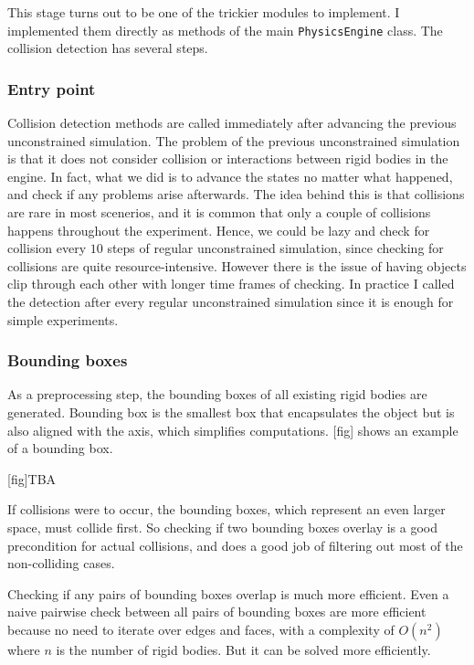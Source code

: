 \documentclass[12pt,a4paper,twoside,openright]{report}
\newcommand{\code}{\texttt}
\begin{document}
This stage turns out to be one of the trickier modules to implement. I implemented them directly as methods of the main \code{PhysicsEngine} class. The collision detection has several steps.

\subsubsection{Entry point} 
Collision detection methods are called immediately after advancing the previous unconstrained simulation. The problem of the previous unconstrained simulation is that it does not consider collision or interactions between rigid bodies in the engine. In fact, what we did is to advance the states no matter what happened, and check if any problems arise afterwards. The idea behind this is that collisions are rare in most scenerios, and it is common that only a couple of collisions happens throughout the experiment. Hence, we could be lazy and check for collision every $10$ steps of regular unconstrained simulation, since checking for collisions are quite resource-intensive. However there is the issue of having objects clip through each other with longer time frames of checking. In practice I called the detection after every regular unconstrained simulation since it is enough for simple experiments.

\subsubsection{Bounding boxes}
As a preprocessing step, the bounding boxes of all existing rigid bodies are generated. Bounding box is the smallest box that encapsulates the object but is also aligned with the axis, which simplifies computations. [fig] shows an example of a bounding box.

[fig]TBA

If collisions were to occur, the bounding boxes, which represent an even larger space, must collide first. So checking if two bounding boxes overlay is a good precondition for actual collisions, and does a good job of filtering out most of the non-colliding cases.

Checking if any pairs of bounding boxes overlap is much more efficient. Even a naive pairwise check between all pairs of bounding boxes are more efficient because no need to iterate over edges and faces, with a complexity of $O(n^2)$ where $n$ is the number of rigid bodies. But it can be solved more efficiently.
\end{document}
